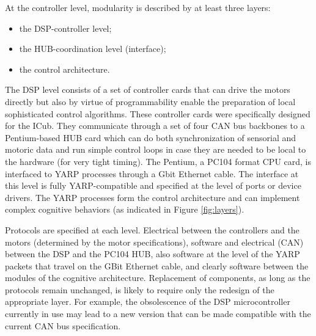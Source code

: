 At the controller level, modularity is described by at least three layers:
\begin{itemize}
	\item the DSP-controller level;
	\item the HUB-coordination level (interface);
	\item the control architecture.
\end{itemize}
The DSP level consists of a set of controller cards that can drive the motors
directly but also by virtue of programmability enable the preparation of local
sophisticated control algorithms. These controller cards were specifically 
designed for the ICub. They communicate through a set of four CAN bus backbones
to a Pentium-based HUB card which can do both synchronization of sensorial and
motoric data and run simple control loops in case they are needed to be local 
to the hardware (for very tight timing). The Pentium, a PC104 format CPU card, is 
interfaced to YARP processes through a Gbit Ethernet cable.
The interface at this level is fully YARP-compatible and specified at the level
of ports or device drivers. The YARP processes form the control architecture 
and can implement complex cognitive behaviors (as indicated in Figure \ref{fig:layers}).

Protocols are specified at each level. Electrical between the controllers and the
motors (determined by the motor specifications), software and electrical (CAN) 
between the DSP and the PC104 HUB, also software at the level of the YARP 
packets that travel on the GBit Ethernet cable, and clearly software between 
the modules of the cognitive architecture. 
Replacement of components, as long as the protocols remain unchanged, is likely
to require only the redesign of the appropriate layer. For example, the obsolescence 
of the DSP microcontroller currently in use may lead to a new version that can 
be made compatible with the current CAN bus specification. 



